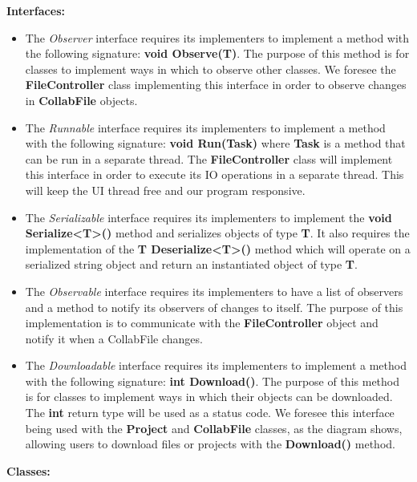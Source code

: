 \documentclass[twoside,letterpaper]{article}
\begin{document}
	\textbf{Interfaces:}\\
	\begin{itemize}
		\item The \textit{Observer} interface requires its implementers to implement a method with the following signature: \textbf{void Observe(T)}. The purpose of this method is for classes to implement ways in which to observe other classes. We foresee the \textbf{FileController} class implementing this interface in order to observe changes in \textbf{CollabFile} objects.
		\item The \textit{Runnable} interface requires its implementers to implement a method with the following signature: \textbf{void Run(Task)} where \textbf{Task} is a method that can be run in a separate thread. The \textbf{FileController} class will implement this interface in order to execute its IO operations in a separate thread. This will keep the UI thread free and our program responsive.
		\item The \textit{Serializable} interface requires its implementers to implement the \textbf{void Serialize<T>()} method and serializes objects of type \textbf{T}. It also requires the implementation of the \textbf{T Deserialize<T>()} method which will operate on a serialized string object and return an instantiated object of type \textbf{T}.
		\item The \textit{Observable} interface requires its implementers to have a list of observers and a method to notify its observers of changes to itself. The purpose of this implementation is to communicate with the \textbf{FileController} object and notify it when a CollabFile changes.
		\item The \textit{Downloadable} interface requires its implementers to implement a method with the following signature: \textbf{int Download()}. The purpose of this method is for classes to implement ways in which their objects can be downloaded. The \textbf{int} return type will be used as a status code. We foresee this interface being used with the \textbf{Project} and \textbf{CollabFile} classes, as the diagram shows, allowing users to download files or projects with the \textbf{Download()} method.
	\end{itemize}
	\textbf{Classes:}
\end{document}

